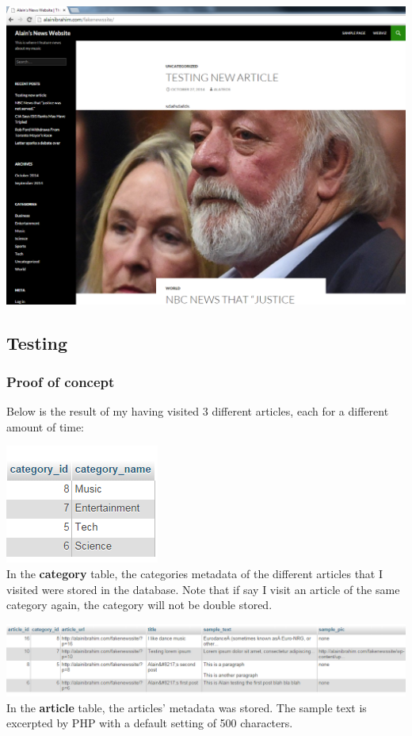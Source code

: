 \documentclass[12pt]{article}
\begin{document}
\noindent\includegraphics[scale=0.4]{img/fakenewssite_main} 

\newpage

\subsection{Testing}
\subsubsection{Proof of concept}
Below is the result of my having visited 3 different articles, each for a different amount of time:

\noindent\includegraphics[scale=1]{img/results_categories} \\
\noindent In the \textbf{category} table, the categories metadata of the different articles that I visited were stored in the database. Note that if say I visit an article of the same category again, the category will not be double stored. 

\noindent\includegraphics[scale=0.6]{img/results_articles}
\noindent In the \textbf{article} table, the articles' metadata was stored. The sample text is excerpted by PHP with a default setting of 500 characters. \\ \\ 
\end{document}
